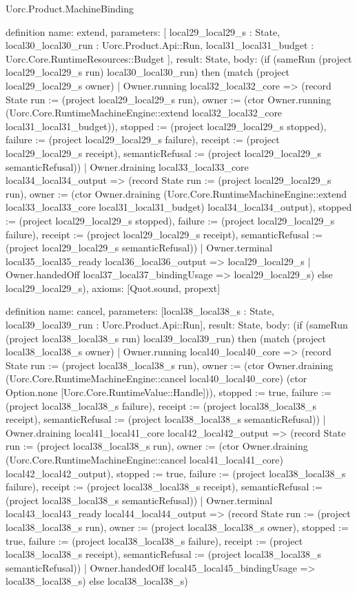 \begin{lexlean}{Uorc.Product.MachineBinding}
\begin{semanticmodule}
definition{
  name: extend,
  parameters: [
    local29_local29_s : State,
    local30_local30_run : Uorc.Product.Api::Run,
    local31_local31_budget : Uorc.Core.RuntimeResources::Budget
  ],
  result: State,
  body: (if (sameRun (project local29_local29_s run) local30_local30_run) then (match (project local29_local29_s owner)
    | Owner.running local32_local32_core => (record State {run := (project local29_local29_s run), owner := (ctor Owner.running (Uorc.Core.RuntimeMachineEngine::extend local32_local32_core local31_local31_budget)), stopped := (project local29_local29_s stopped), failure := (project local29_local29_s failure), receipt := (project local29_local29_s receipt), semanticRefusal := (project local29_local29_s semanticRefusal)})
    | Owner.draining local33_local33_core local34_local34_output => (record State {run := (project local29_local29_s run), owner := (ctor Owner.draining (Uorc.Core.RuntimeMachineEngine::extend local33_local33_core local31_local31_budget) local34_local34_output), stopped := (project local29_local29_s stopped), failure := (project local29_local29_s failure), receipt := (project local29_local29_s receipt), semanticRefusal := (project local29_local29_s semanticRefusal)})
    | Owner.terminal local35_local35_ready local36_local36_output => local29_local29_s
    | Owner.handedOff local37_local37_bindingUsage => local29_local29_s) else local29_local29_s),
  axioms: [Quot.sound, propext]
}

definition{
  name: cancel,
  parameters: [local38_local38_s : State, local39_local39_run : Uorc.Product.Api::Run],
  result: State,
  body: (if (sameRun (project local38_local38_s run) local39_local39_run) then (match (project local38_local38_s owner)
    | Owner.running local40_local40_core => (record State {run := (project local38_local38_s run), owner := (ctor Owner.draining (Uorc.Core.RuntimeMachineEngine::cancel local40_local40_core) (ctor Option.none [Uorc.Core.RuntimeValue::Handle])), stopped := true, failure := (project local38_local38_s failure), receipt := (project local38_local38_s receipt), semanticRefusal := (project local38_local38_s semanticRefusal)})
    | Owner.draining local41_local41_core local42_local42_output => (record State {run := (project local38_local38_s run), owner := (ctor Owner.draining (Uorc.Core.RuntimeMachineEngine::cancel local41_local41_core) local42_local42_output), stopped := true, failure := (project local38_local38_s failure), receipt := (project local38_local38_s receipt), semanticRefusal := (project local38_local38_s semanticRefusal)})
    | Owner.terminal local43_local43_ready local44_local44_output => (record State {run := (project local38_local38_s run), owner := (project local38_local38_s owner), stopped := true, failure := (project local38_local38_s failure), receipt := (project local38_local38_s receipt), semanticRefusal := (project local38_local38_s semanticRefusal)})
    | Owner.handedOff local45_local45_bindingUsage => local38_local38_s) else local38_local38_s)
}


\end{semanticmodule}
\end{lexlean}
